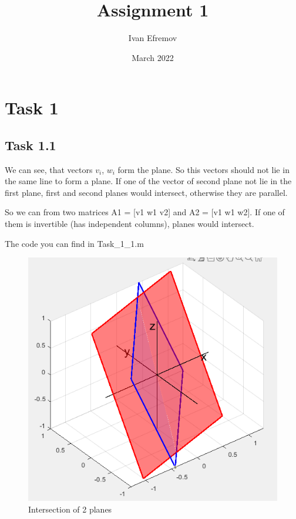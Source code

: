 \documentclass[12pt]{article}
\title{Assignment 1}
\author{Ivan Efremov}
\date{March 2022}
\begin{document}
\maketitle

\section{Task 1}
\subsection{Task 1.1}
We can see, that vectors $v_i$, $w_i$ form the plane. So this vectors  should not lie in the same line to form a plane.
If one of the vector of second plane not lie in the first plane, first and second planes would intersect, otherwise they are parallel.  

So we can from two matrices A1 = [v1 w1 v2] and A2 = [v1 w1 w2]. If one of them is invertible (has independent columns), planes would intersect. 

The code you can find in Task\string_1\string_1.m

\begin{figure}[h]
    \centering
    \includegraphics[scale=0.4]{Task_1_1.png}
    \caption{Intersection of 2 planes}
    \label{fig:my_label}
\end{figure}
\end{document}
